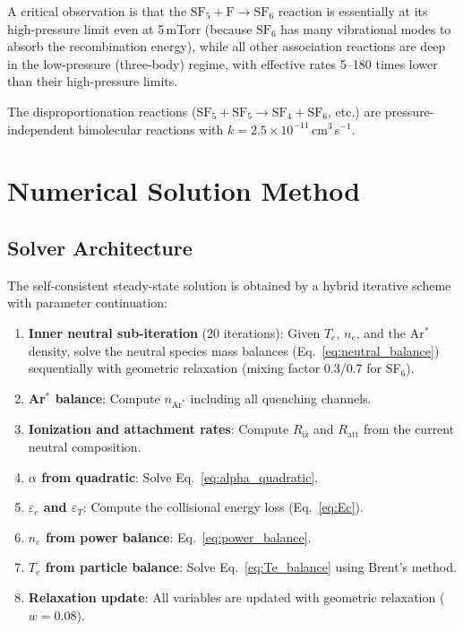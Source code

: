 \documentclass[11pt,a4paper]{article}
\newcommand{\SFsix}{\mathrm{SF}_6}
\newcommand{\SFfive}{\mathrm{SF}_5}
\newcommand{\SFfour}{\mathrm{SF}_4}
\newcommand{\Ar}{\mathrm{Ar}}
\newcommand{\Te}{T_e}
\newcommand{\nelec}{n_e}
\begin{document}
A critical observation is that the $\SFfive + \mathrm{F} \to \SFsix$ reaction is essentially at its high-pressure limit even at 5\,mTorr (because $\SFsix$ has many vibrational modes to absorb the recombination energy), while all other association reactions are deep in the low-pressure (three-body) regime, with effective rates 5--180 times lower than their high-pressure limits.

The disproportionation reactions ($\SFfive + \SFfive \to \SFfour + \SFsix$, etc.) are pressure-independent bimolecular reactions with $k = 2.5 \times 10^{-11}$\,cm$^3$\,s$^{-1}$.

\section{Numerical Solution Method}

\subsection{Solver Architecture}

The self-consistent steady-state solution is obtained by a hybrid iterative scheme with parameter continuation:

\begin{enumerate}
\item \textbf{Inner neutral sub-iteration} (20 iterations): Given $\Te$, $\nelec$, and the Ar$^*$ density, solve the neutral species mass balances (Eq.~\ref{eq:neutral_balance}) sequentially with geometric relaxation (mixing factor 0.3/0.7 for SF$_6$).
\item \textbf{Ar$^*$ balance}: Compute $n_{\Ar^*}$ including all quenching channels.
\item \textbf{Ionization and attachment rates}: Compute $R_\mathrm{iz}$ and $R_\mathrm{att}$ from the current neutral composition.
\item \textbf{$\alpha$ from quadratic}: Solve Eq.~\eqref{eq:alpha_quadratic}.
\item \textbf{$\varepsilon_c$ and $\varepsilon_T$}: Compute the collisional energy loss (Eq.~\ref{eq:Ec}).
\item \textbf{$\nelec$ from power balance}: Eq.~\eqref{eq:power_balance}.
\item \textbf{$\Te$ from particle balance}: Solve Eq.~\eqref{eq:Te_balance} using Brent's method.
\item \textbf{Relaxation update}: All variables are updated with geometric relaxation ($w = 0.08$).
\end{enumerate}
\end{document}
